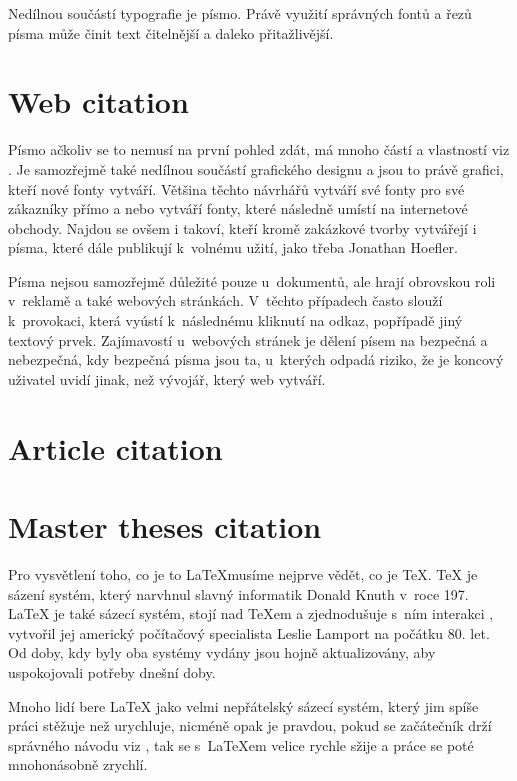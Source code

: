 \documentclass[11pt, a4paper]{article}
\renewcommand{\refname}{Literatura}
\newcommand\bibstylename{czplain}
\begin{document}
Nedílnou součástí typografie je písmo. Právě využití správných fontů a řezů písma může činit text čitelnější a daleko přitažlivější.

\newpage

\section{Web citation}
Písmo ačkoliv se to nemusí na první pohled zdát, má mnoho částí a vlastností viz \cite{typeface:2008}. Je samozřejmě také nedílnou součástí grafického 
designu a jsou to právě grafici, kteří nové fonty vytváří. Většina těchto návrhářů vytváří své fonty pro své zákazníky přímo a nebo 
vytváří fonty, které následně umístí na internetové obchody. Najdou se ovšem i takoví, kteří kromě zakázkové tvorby vytvářejí i písma, které dále publikují k~volnému užití, jako třeba Jonathan Hoefler.

Písma nejsou samozřejmě důležité pouze u~dokumentů, ale hrají obrovskou roli v~reklamě a také webových stránkách. V~těchto případech často slouží k~provokaci, která vyústí k~následnému kliknutí na odkaz, popřípadě jiný textový prvek.
Zajímavostí u~webových stránek je dělení písem na bezpečná a nebezpečná, kdy bezpečná písma jsou ta, u~kterých odpadá riziko, že je koncový uživatel uvidí jinak, než vývojář, který web vytváří.

\section{Article citation}
\lipsum[2-3]\cite{olsak:2014}

\newpage

\section{Master theses citation}
Pro vysvětlení toho, co je to \LaTeX musíme nejprve vědět, co je \TeX. {\TeX} je sázení systém, který narvhnul slavný informatik Donald Knuth v~roce 197. {\LaTeX} je také sázecí systém, stojí nad {\TeX}em a zjednodušuje s~ním interakci ,
vytvořil jej americký počítačový specialista Leslie Lamport na počátku 80. let. Od doby, kdy byly oba systémy vydány jsou hojně aktualizovány, aby uspokojovali potřeby dnešní doby.

Mnoho lidí bere {\LaTeX} jako velmi nepřátelský sázecí systém, který jim spíše práci stěžuje než urychluje, nicméně opak je pravdou, pokud se začátečník drží správného návodu viz \cite{sirucek:2007}, tak se s~{\LaTeX}em velice rychle sžije a práce se poté mnohonásobně zrychlí.

\newpage


\addcontentsline{toc}{section}{\refname}

\end{document}
